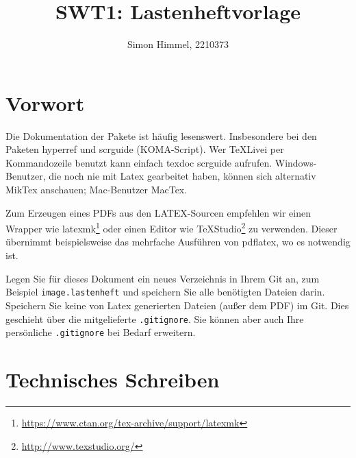 \documentclass[parskip=full]{scrartcl}
\title{SWT1: Lastenheftvorlage}
\author{Simon Himmel, 2210373}
\begin{document}
\maketitle

%
%
\section{Vorwort}
Die Dokumentation der Pakete ist häufig lesenswert.
Insbesondere bei den Paketen hyperref und scrguide (KOMA-Script).
Wer TeXLivei per Kommandozeile benutzt kann einfach texdoc scrguide aufrufen.
Windows-Benutzer, die noch nie mit Latex gearbeitet haben, können sich alternativ MikTex anschauen; Mac-Benutzer MacTex.

Zum Erzeugen eines PDFs aus den LATEX-Sourcen empfehlen wir einen Wrapper wie latexmk\footnote{\url{https://www.ctan.org/tex-archive/support/latexmk}} oder einen Editor wie TeXStudio\footnote{\url{http://www.texstudio.org/}} zu verwenden.
Dieser übernimmt beispielsweise das mehrfache Ausführen von pdflatex, wo es notwendig ist.

Legen Sie für dieses Dokument ein neues Verzeichnis in Ihrem Git an, zum Beispiel \texttt{image.lastenheft} und speichern Sie alle benötigten Dateien darin.
Speichern Sie keine von Latex generierten Dateien (außer dem PDF) im Git.
Dies geschieht über die mitgelieferte \texttt{.gitignore}.
Sie können aber auch Ihre persönliche \texttt{.gitignore} bei Bedarf erweitern.

\section{Technisches Schreiben}
\end{document}
